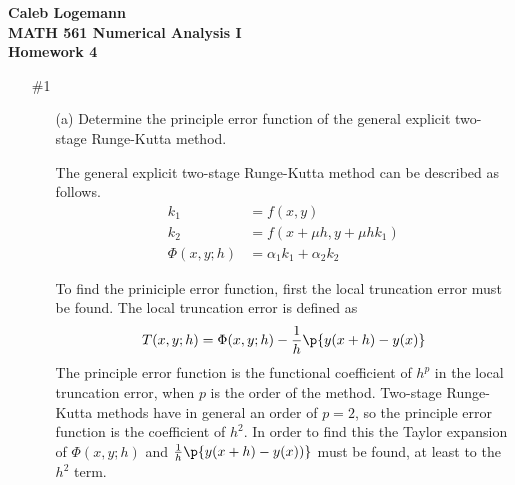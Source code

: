 \documentclass[11pt]{article}
\begin{document}
\noindent \textbf{\Large{Caleb Logemann \\
MATH 561 Numerical Analysis I \\
Homework 4
}}

\begin{enumerate}
    \item[\#1] %
        \begin{enumerate}
            \item[(a)]
                Determine the principle error function of the general explicit
                two-stage Runge-Kutta method.

                The general explicit two-stage Runge-Kutta method can be
                described as follows.
                \begin{align*}
                    k_1 &= f(x,y) \\
                    k_2 &= f(x + \mu h, y + \mu h k_1) \\
                    \Phi(x, y; h) &= \alpha_1 k_1 + \alpha_2 k_2
                \end{align*}

                To find the priniciple error function, first the local
                truncation error must be found.
                The local truncation error is defined as
                \[
                    T(x, y; h) = \Phi(x, y; h) - \frac{1}{h}\p{y(x + h) - y(x)}
                \]
                The principle error function is the functional coefficient of $h^p$
                in the local truncation error, when $p$ is the order of the method.
                Two-stage Runge-Kutta methods have in general an order of $p = 2$,
                so the principle error function is the coefficient of $h^2$.
                In order to find this the Taylor expansion of $\Phi(x, y; h)$ and
                $\frac{1}{h}\p{y(x + h) - y(x))}$ must be found, at least to the 
                $h^2$ term.


\end{enumerate}
\end{enumerate}
\end{document}
